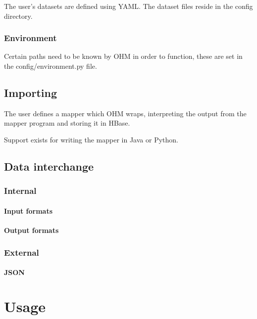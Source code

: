 \documentclass[a4paper,10pt]{book}
\begin{document}
The user's datasets are defined using YAML. The dataset files reside in the
config directory.


\subsection{Environment}

Certain paths need to be known by OHM in order to function, these are set
in the config/environment.py file.



\section{Importing}

The user defines a mapper which OHM wraps, interpreting the output from the
mapper program and storing it in HBase.

Support exists for writing the mapper in Java or Python.



\section{Data interchange}

\subsection{Internal}

\subsubsection{Input formats}

\subsubsection{Output formats}

\subsection{External}

\subsubsection{JSON}


\chapter{Usage}
\end{document}
